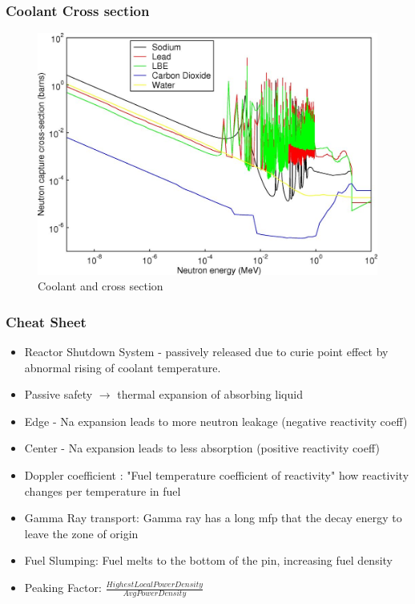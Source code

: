 \documentclass[9pt]{beamer}
\begin{document}
\begin{frame}
\frametitle{Coolant Cross section}
\begin{figure}[htbp!]
  \begin{center}
      \includegraphics[scale=0.7]{./images/coolant.jpg}
  \end{center}
  \caption{Coolant and cross section \cite{stacey_nuclear_2007}}
  \label{fig:reac}
\end{figure}
\end{frame}

\begin{frame}
\frametitle{Cheat Sheet}
\begin{itemize}
  \item Reactor Shutdown System - passively released due to curie point effect by abnormal rising of coolant temperature.
  \item Passive safety $\rightarrow$ thermal expansion of absorbing liquid
  \item Edge - Na expansion leads to more neutron leakage (negative reactivity coeff)
  \item Center - Na expansion leads to less absorption (positive reactivity coeff)
  \item Doppler coefficient : "Fuel temperature coefficient of reactivity" how reactivity changes per temperature in fuel
  \item Gamma Ray transport: Gamma ray has a long mfp that the decay energy to leave the zone of origin
  \item Fuel Slumping: Fuel melts to the bottom of the pin, increasing fuel density
  \item Peaking Factor: $\frac{Highest Local Power Density}{Avg Power Density}$
\end{itemize}
\end{frame}
\end{document}
